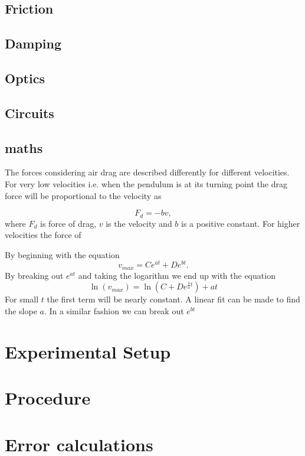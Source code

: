 \documentclass[11pt, a4paper]{article}
\begin{document}
\subsection{Friction}

\subsection{Damping}

\subsection{Optics}
\subsection{Circuits}
\subsection{maths}

The forces considering air drag are described differently for different velocities. For very low velocities i.e. when the pendulum is at its turning point the drag force will be proportional to the velocity as

\[
F_d = -bv,
\]
where $F_d$ is force of drag, $v$ is the velocity and $b$ is a positive constant.
For higher velocities the force of 





By beginning with the equation
\[
v_{max} = Ce^{at} + De^{bt}.
\]
By breaking out $e^{at}$ and taking the logarithm we end up with the equation
\[
\ln(v_{max}) = \ln(C + De^{\frac{b}{a}t}) + at
\]
For small $t$ the first term will be nearly constant. A linear fit can be made to find the slope $a$.
In a similar fashion we can break out $e^{bt}$

\section{Experimental Setup}
\section{Procedure}

\section{Error calculations}
\end{document}
